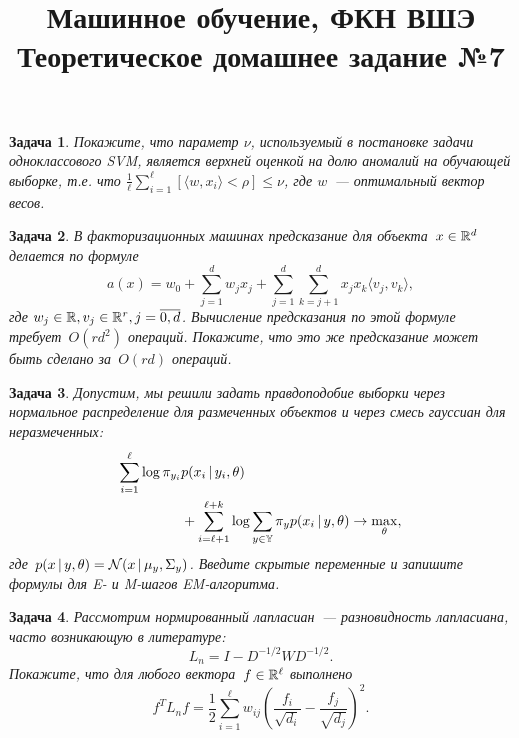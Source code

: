 \documentclass[12pt,fleqn]{article}
\title{Машинное обучение, ФКН ВШЭ\\Теоретическое домашнее задание №7}
\author{}
\date{}
\newtheorem{esProblem}{Задача}
\begin{document}
\maketitle

\begin{esProblem}
    Покажите, что параметр $\nu$, используемый в постановке задачи одноклассового SVM,
    является верхней оценкой на долю аномалий на обучающей выборке, т.е. что
    $\frac{1}{\ell} \sum_{i=1}^\ell [\langle w, x_i \rangle < \rho] \leq \nu$, где $w$~--- оптимальный вектор весов.
\end{esProblem}

\begin{esProblem}
    В факторизационных машинах предсказание для объекта~$x \in \mathbb{R}^{d}$ делается по формуле
    \[
        a(x)
        =
        w_0
        +
        \sum_{j = 1}^{d}
            w_j x_j
        +
        \sum_{j = 1}^{d} \sum_{k = j + 1}^{d}
            x_j x_k
            \langle v_j, v_k \rangle,
    \]
    где $w_j \in \mathbb{R}, v_j \in \mathbb{R}^r, j = \overline{0, d}$.
    Вычисление предсказания по этой формуле требует~$O(rd^2)$ операций. Покажите, что это же предсказание может быть сделано за~$O(rd)$ операций.
\end{esProblem}

\begin{esProblem}
    Допустим, мы решили задать правдоподобие выборки через нормальное распределение для размеченных объектов
    и через смесь гауссиан для неразмеченных:
    \begin{align*}
        \sum_{i = 1}^{\ell}
            \log \pi_{y_i} &p(x_i \mspace{3mu}{|}\mspace{3mu} y_i, \theta)\\
        &+
        \sum_{i = \ell + 1}^{\ell + k}
        \log \sum_{y \in \mathbb{Y}}
            \pi_y p(x_i \mspace{3mu}{|}\mspace{3mu} y, \theta)
        \to
        \max_\theta,
    \end{align*}
    где~$p(x \mspace{3mu}{|}\mspace{3mu} y, \theta) = \mathcal{N}(x \mspace{3mu}{|}\mspace{3mu} \mu_y, \Sigma_y)$.
    Введите скрытые переменные и запишите формулы для E- и M-шагов EM-алгоритма.
\end{esProblem}

\begin{esProblem}
    Рассмотрим нормированный лапласиан~--- разновидность лапласиана, часто возникающую в литературе:
    \[
        L_n
        =
        I - D^{-1/2} W D^{-1/2}.
    \]
    Покажите, что для любого вектора~$f \in \mathbb{R}^\ell$ выполнено
    \[
        f^T L_n f
        =
        \frac12
        \sum_{i = 1}^{\ell}
            w_{ij}
            \left(
                \frac{f_i}{\sqrt{d_i}}
                -
                \frac{f_j}{\sqrt{d_j}}
            \right)^2.
    \]
\end{esProblem}
\end{document}

